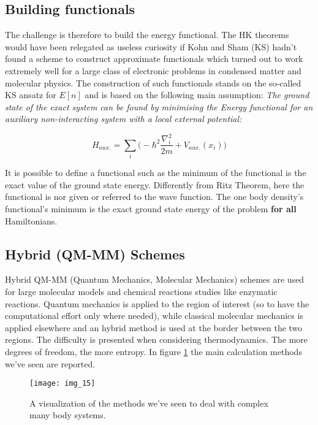 \subsection{Building functionals}
The challenge is therefore to build the energy functional.
The HK theorems would have been relegated as useless curiosity if Kohn and Sham (KS) hadn't found a scheme to construct approximate functionals which turned out to work extremely well for a large class of electronic problems in condensed matter and molecular physics.
The construction of such functionals stands on the so-called KS ansatz for $E[n]$ and is based on the following main assumption: \textit{The ground state of the exact system can be found by minimising the Energy functional for an auxiliary non-interacting system with a local external potential:}

$$H_{aux.} = \sum_i \bigg(-\hbar^2 \frac{\nabla_i^2}{2m} + V_{aux.}(x_i) \bigg)$$

It is possible to define a functional such as the minimum of the functional is the exact value of the ground state energy.
Differently from Ritz Theorem, here the functional is nor given or referred to the wave function.
The one body density's functional's minimum is the exact ground state energy of the problem \textbf{for all} Hamiltonians.

\subsection{Hybrid (QM-MM) Schemes}
Hybrid QM-MM (Quantum Mechanics, Molecular Mechanics) schemes are used for large molecular models and chemical reactions studies like enzymatic reactions.
Quantum mechanics is applied to the region of interest (so to have the computational effort only where needed),  while classical molecular mechanics is applied elsewhere and an hybrid method is used at the border between the two regions.
The difficulty is presented when considering thermodynamics. The more degrees of freedom, the more entropy.
In figure \ref{fig:summary} the main calculation methods we've seen are reported.

\begin{figure}[htbp!]
	\centering
	\texttt{[image: img\_15]}
	\caption{A visualization of the methods we've seen to deal with complex many body systems.}
	\label{fig:summary}
\end{figure}
